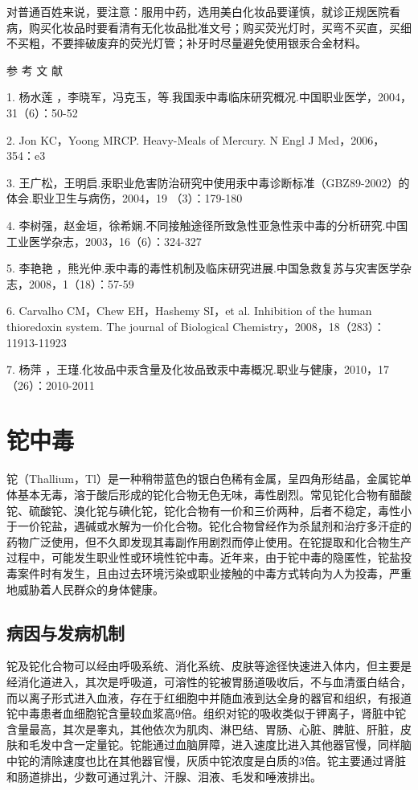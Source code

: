 对普通百姓来说，要注意：服用中药，选用美白化妆品要谨慎，就诊正规医院看病，购买化妆品时要看清有无化妆品批准文号；购买荧光灯时，买弯不买直，买细不买粗，不要摔破废弃的荧光灯管；补牙时尽量避免使用银汞合金材料。

\hypertarget{text00158.htmlux5cux23CHP5-6-2-5}{}
参 考 文 献

1. 杨水莲
，李晓军，冯克玉，等.我国汞中毒临床研究概况.中国职业医学，2004，31（6）：50-52

2. Jon KC，Yoong MRCP. Heavy-Meals of Mercury. N Engl J
Med，2006，354：e3

3.
王广松，王明启.汞职业危害防治研究中使用汞中毒诊断标准（GBZ89-2002）的体会.职业卫生与病伤，2004，19
（3）：179-180

4.
李树强，赵金垣，徐希娴.不同接触途径所致急性亚急性汞中毒的分析研究.中国工业医学杂志，2003，16（6）：324-327

5. 李艳艳
，熊光仲.汞中毒的毒性机制及临床研究进展.中国急救复苏与灾害医学杂志，2008，1（18）：57-59

6. Carvalho CM，Chew EH，Hashemy SI，et al. Inhibition of the human
thioredoxin system. The journal of Biological
Chemistry，2008，18（283）：11913-11923

7. 杨萍
，王瑾.化妆品中汞含量及化妆品致汞中毒概况.职业与健康，2010，17（26）：2010-2011

\protect\hypertarget{text00159.html}{}{}

\section{铊中毒}

铊（Thallium，Tl）是一种稍带蓝色的银白色稀有金属，呈四角形结晶，金属铊单体基本无毒，溶于酸后形成的铊化合物无色无味，毒性剧烈。常见铊化合物有醋酸铊、硫酸铊、溴化铊与碘化铊，铊化合物有一价和三价两种，后者不稳定，毒性小于一价铊盐，遇碱或水解为一价化合物。铊化合物曾经作为杀鼠剂和治疗多汗症的药物广泛使用，但不久即发现其毒副作用剧烈而停止使用。在铊提取和化合物生产过程中，可能发生职业性或环境性铊中毒。近年来，由于铊中毒的隐匿性，铊盐投毒案件时有发生，且由过去环境污染或职业接触的中毒方式转向为人为投毒，严重地威胁着人民群众的身体健康。

\subsection{病因与发病机制}

铊及铊化合物可以经由呼吸系统、消化系统、皮肤等途径快速进入体内，但主要是经消化道进入，其次是呼吸道，可溶性的铊被胃肠道吸收后，不与血清蛋白结合，而以离子形式进入血液，存在于红细胞中并随血液到达全身的器官和组织，有报道铊中毒患者血细胞铊含量较血浆高9倍。组织对铊的吸收类似于钾离子，肾脏中铊含量最高，其次是睾丸，其他依次为肌肉、淋巴结、胃肠、心脏、脾脏、肝脏，皮肤和毛发中含一定量铊。铊能通过血脑屏障，进入速度比进入其他器官慢，同样脑中铊的清除速度也比在其他器官慢，灰质中铊浓度是白质的3倍。铊主要通过肾脏和肠道排出，少数可通过乳汁、汗腺、泪液、毛发和唾液排出。

